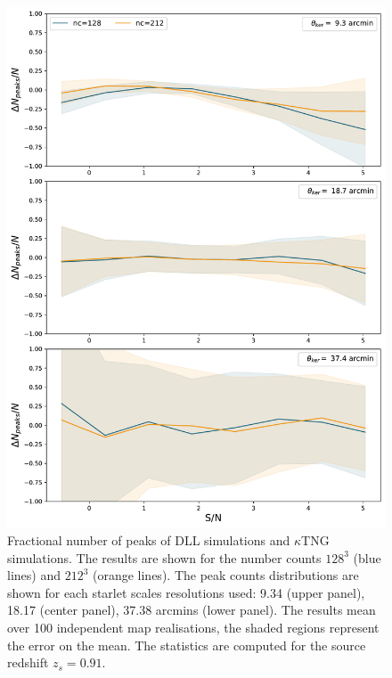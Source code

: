 \documentclass{aa}
\begin{document}
\begin{appendix}
\renewcommand{\thefigure}{C\arabic{figure}}
\setcounter{figure}{1}
\begin{figure}\label{peaks_high}
    \centering
    \includegraphics[width=\columnwidth]{paper/figures/res_peak_DLL_vs_ktng_high.pdf}
    \caption{Fractional number of peaks of DLL simulations and $\kappa$TNG simulations. The results are shown for the number counts $128^3$ (blue lines) and $212^3$ (orange lines). The peak counts distributions are shown for each starlet scales resolutions used: 9.34 (upper panel), 18.17 (center panel), 37.38 arcmins (lower panel).
  The results mean over 100 independent map realisations, the shaded regions represent the error on the mean. The statistics are computed for the source redshift $z_s=0.91$. }
\end{figure}


\end{appendix}
\end{document}

